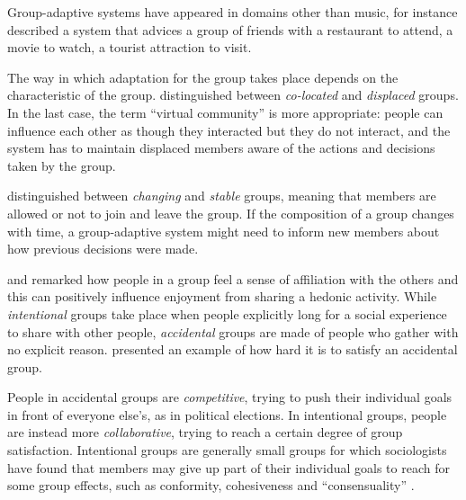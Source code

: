 Group-adaptive systems have appeared in domains other than music, for instance \citet{McCarthy02} described a system that advices a group of friends with a restaurant to attend, \citet{OConnor01} a movie to watch, \citet{McCarthy06b} a tourist attraction to visit. %

The way in which adaptation for the group takes place depends on the characteristic of the group.
\citet{Hill95} distinguished between \emph{co-located} and \emph{displaced} groups.
In the last case, the term ``virtual community'' is more appropriate: people can influence each other as though they interacted but they do not interact, and the system has to maintain displaced members aware of the actions and decisions taken by the group.

\citet{Haseman02} distinguished between \emph{changing} and \emph{stable} groups, meaning that members are allowed or not to join and leave the group. If the composition of a group changes with time, a group-adaptive system might need to inform new members about how previous decisions were made.

\citet{Saklofske89} and \citet{Raghunathan08} remarked how people in a group feel a sense of affiliation with the others and this can positively influence enjoyment from sharing a hedonic activity.
While \emph{intentional} groups take place when people explicitly long for a social experience to share with other people, %
\emph{accidental} groups are made of people who gather with no explicit reason.
\citet{McCarthy98} presented an example of how hard it is to satisfy an accidental group.


People in accidental groups are \emph{competitive}, trying to push their individual goals in front of everyone else's, as in political elections. 
In intentional groups, people are instead more \emph{collaborative}, trying to reach a certain degree of group satisfaction.
Intentional groups are generally small groups for which sociologists have found that members may give up part of their individual goals to reach for some group effects, such as conformity, cohesiveness and ``consensuality'' \cite{Hogg96}.

